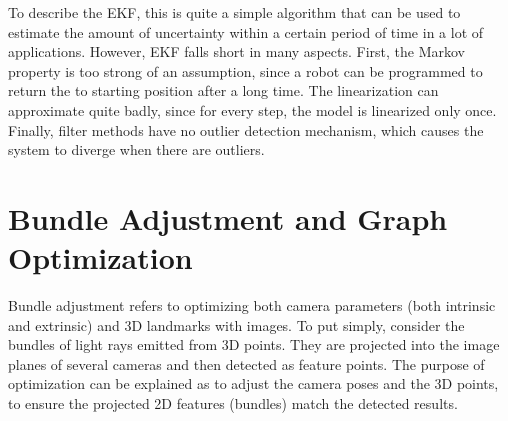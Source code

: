 \documentclass{article}
\newcounter{algo}[section]
\begin{document}
  To describe the EKF, this is quite a simple algorithm that can be used to estimate the amount of uncertainty within a certain period of time in a lot of applications. However, EKF falls short in many aspects. First, the Markov property is too strong of an assumption, since a robot can be programmed to return the to starting position after a long time. The linearization can approximate quite badly, since for every step, the model is linearized only once. Finally, filter methods have no outlier detection mechanism, which causes the system to diverge when there are outliers. 

\section{Bundle Adjustment and Graph Optimization}

  Bundle adjustment refers to optimizing both camera parameters (both intrinsic and extrinsic) and 3D landmarks with images. To put simply, consider the bundles of light rays emitted from 3D points. They are projected into the image planes of several cameras and then detected as feature points. The purpose of optimization can be explained as to adjust the camera poses and the 3D points, to ensure the projected 2D features (bundles) match the detected results. 
\end{document}
